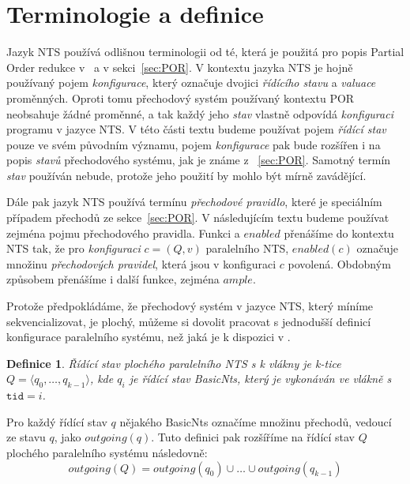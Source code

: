\documentclass{fithesis2}
\newtheorem{definition}{Definice}
\newcommand{\tuple}[1]{\langle #1 \rangle}
\begin{document}
\section{Terminologie a definice}
Jazyk NTS používá odlišnou terminologii od té, která je použitá pro popis Partial Order redukce v~\cite{CLARKE} a v sekci~\ref{sec:POR}. V kontextu jazyka NTS je hojně používaný pojem \textit{konfigurace}, který označuje dvojici \textit{řídícího stavu} a \textit{valuace} proměnných. Oproti tomu přechodový systém používaný kontextu POR neobsahuje žádné proměnné, a tak každý jeho \textit{stav} vlastně odpovídá \textit{konfiguraci} programu v jazyce NTS. V této části textu budeme používat pojem \textit{řídící stav} pouze ve svém původním významu, pojem \textit{konfigurace} pak bude rozšířen i na popis \textit{stavů} přechodového systému, jak je známe z ~\ref{sec:POR}. Samotný termín \textit{stav} používán nebude, protože jeho použití by mohlo být mírně zavádějící.

Dále pak jazyk NTS používá termínu \textit{přechodové pravidlo}, které je speciálním případem přechodů ze sekce~\ref{sec:POR}. V následujícím textu budeme používat zejména pojmu přechodového pravidla. Funkci a $\mathit{enabled}$ přenášíme do kontextu NTS tak, že pro \textit{konfiguraci} $c=(Q, v)$ paralelního NTS, $\mathit{enabled}(c)$ označuje množinu \textit{přechodových pravidel}, která jsou v konfiguraci $c$ povolená. Obdobným způsobem přenášíme i další funkce, zejména $\mathit{ample}$.

Protože předpokládáme, že přechodový systém v jazyce NTS, který míníme sekvencializovat, je plochý, můžeme si dovolit pracovat s jednodušší definicí konfigurace paralelního systému, než jaká je k dispozici v \cite{NTSref}.
\begin{definition}
Řídící stav plochého paralelního NTS s k vlákny je k-tice $Q = \tuple{q_0, \ldots, q_{k-1}}$, kde $q_i$ je řídící stav BasicNts, který je vykonáván ve vlákně s $\texttt{tid} = i$.
\end{definition}

Pro každý řídící stav $q$ nějakého BasicNts označíme množinu přechodů, vedoucí ze stavu $q$, jako $\mathit{outgoing}(q)$. Tuto definici pak rozšíříme na řídící stav $Q$ plochého paralelního systému následovně:
\begin{equation}
\mathit{outgoing}(Q) = \mathit{outgoing}(q_0) \cup \ldots \cup \mathit{outgoing}(q_{k-1})
\end{equation}
\end{document}
